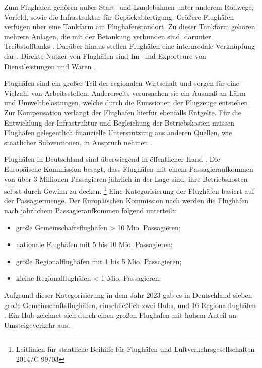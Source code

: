 Zum Flughafen gehören außer Start- und Landebahnen unter anderem 
Rollwege, Vorfeld, sowie die Infrastruktur für Gepäckabfertigung. 
Größere Flughäfen verfügen über eine Tankfarm am Flughafenstandort. 
Zu dieser Tankfarm gehören mehrere Anlagen, die mit der Betankung verbunden sind, darunter Treibstofftanks \cite{moriarty2024sustainable}.
Darüber hinaus stellen Flughäfen eine intermodale Verknüpfung dar \cite{conrady2019luftverkehr}. %
Direkte Nutzer von Flughäfen sind Im- und Exporteure von Dienstleistungen und Waren \cite{schaar2010analysis}. 

Flughäfen sind ein großer Teil der regionalen Wirtschaft \cite{schaar2010analysis} 
und sorgen für eine Vielzahl von Arbeitsstellen. 
Andererseits verursachen sie ein Ausmaß an Lärm und Umweltbelastungen, 
welche durch die Emissionen der Flugzeuge entstehen.
Zur Kompensation verlangt der Flughafen hierfür ebenfalls Entgelte. %
%
Für die Entwicklung der Infrastruktur und Begleichung der Betriebskosten müssen Flughäfen 
gelegentlich finanzielle Unterstützung aus anderen Quellen, wie staatlicher Subventionen, 
in Anspruch nehmen \cite{schaar2010analysis}. 

Flughäfen in Deutschland sind überwiegend in öffentlicher Hand \cite{conrady2019luftverkehr}.
Die Europäische Kommission besagt, dass Flughäfen mit einem Passagieraufkommen von über 3 Millionen 
Passagieren jährlich in der Lage sind, ihre Betriebskosten selbst durch Gewinn zu decken.
\footnote{\glqq Leitlinien für staatliche Beihilfe für Flughäfen und Luftverkehrsgesellschaften\grqq{} 2014/C 99/03}
Eine Kategorisierung der Flughäfen basiert auf der Passagiermenge. 
Der Europäischen Kommission nach werden die Flughäfen nach jährlichem Passagieraufkommen folgend unterteilt: 
\begin{itemize}
    \item große Gemeinschaftsflughäfen > 10 Mio. Passagieren;
    \item nationale Flughäfen mit 5 bis 10 Mio. Passagieren;
    \item große Regionalflughäfen mit 1 bis 5 Mio. Passagieren;
    \item kleine Regionalflughäfen < 1 Mio. Passagieren.
\end{itemize}
Aufgrund dieser Kategorisierung in dem Jahr 2023 gab es in Deutschland 
sieben große Gemeinschaftsflughäfen, einschließlich zwei Hubs, und 16 Regionalflughäfen \cite{Destatis_Luftverkehr_2024}.
Ein Hub zeichnet sich durch einen großen Flughafen mit hohem Anteil an Umsteigeverkehr aus.

